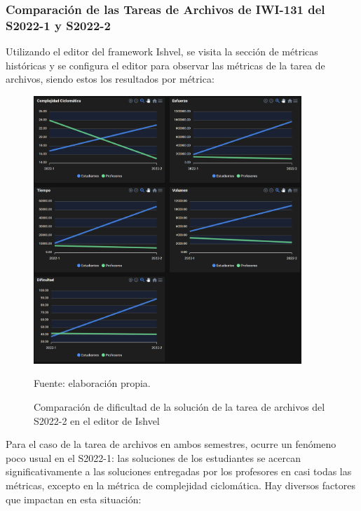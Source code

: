 \documentclass[letterpaper,12pt]{article}
\begin{document}
\subsubsection{Comparación de las Tareas de Archivos de IWI-131 del S2022-1 y S2022-2}
Utilizando el editor del framework Ishvel, se visita la sección de métricas históricas y se configura el editor para observar las métricas de la tarea de archivos, siendo estos los resultados por métrica:
\begin{figure}[H]
  \centering
  \includegraphics[width=0.9\textwidth]{figures/metricsList3.png}
  \caption{Comparación de dificultad de la solución de la tarea de archivos del S2022-2 en el editor de Ishvel} Fuente: elaboración propia.
  \label{img:metricsList3}
\end{figure}

Para el caso de la tarea de archivos en ambos semestres, ocurre un fenómeno poco usual en el S2022-1: las soluciones de los estudiantes se acercan significativamente a las soluciones entregadas por los profesores en casi todas las métricas, excepto en la métrica de complejidad ciclomática. Hay diversos factores que impactan en esta situación:
\end{document}
